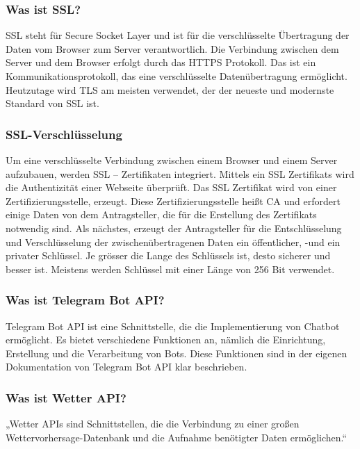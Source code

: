 \subsubsection{Was ist SSL?} 
SSL steht für Secure Socket Layer und ist für die verschlüsselte Übertragung der Daten vom Browser zum Server verantwortlich. Die Verbindung zwischen dem Server und dem Browser erfolgt durch das HTTPS Protokoll. Das ist ein Kommunikationsprotokoll, das eine verschlüsselte Datenübertragung ermöglicht. Heutzutage wird TLS am meisten verwendet, der der neueste und modernste Standard von SSL ist.
\subsubsection{SSL-Verschlüsselung}
Um eine verschlüsselte Verbindung zwischen einem Browser und einem Server aufzubauen, werden SSL – Zertifikaten integriert. Mittels ein SSL Zertifikats wird die Authentizität einer Webseite überprüft. Das SSL Zertifikat wird von einer Zertifizierungsstelle, erzeugt. Diese Zertifizierungsstelle heißt CA und erfordert einige Daten von dem Antragsteller, die für die Erstellung des Zertifikats notwendig sind. Als nächstes, erzeugt der Antragsteller für die Entschlüsselung und Verschlüsselung der zwischenübertragenen Daten ein öffentlicher, -und ein privater Schlüssel. Je grösser die Lange des Schlüssels ist, desto sicherer und besser ist. Meistens werden Schlüssel mit einer Länge von 256 Bit verwendet.
\subsubsection{Was ist Telegram Bot API?} 
Telegram Bot API ist eine Schnittstelle, die die Implementierung von Chatbot ermöglicht. Es bietet verschiedene Funktionen an, nämlich die Einrichtung, Erstellung und die Verarbeitung von Bots. Diese Funktionen sind in der eigenen Dokumentation von Telegram Bot API klar beschrieben.  
\subsubsection{Was ist Wetter API?} 
„Wetter APIs sind Schnittstellen, die die Verbindung zu einer großen Wettervorhersage-Datenbank und die Aufnahme benötigter Daten ermöglichen.“ 
